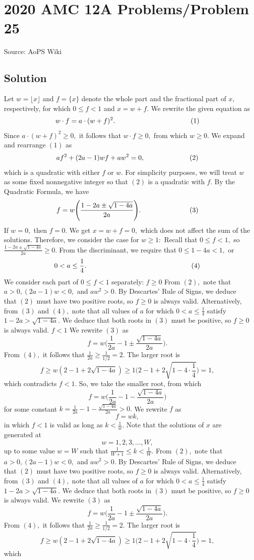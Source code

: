 \documentclass[12pt]{article}
\begin{document}
\section*{{2020 AMC 12A Problems/Problem 25}}
Source: AoPS Wiki

\subsection*{Solution}
Let $w=\lfloor x \rfloor$ and $f=\{x\}$ denote the whole part and the fractional part of $x,$ respectively, for which $0\leq f<1$ and $x=w+f.$ We rewrite the given equation as \[w\cdot f=a\cdot(w+f)^2. \hspace{38.75mm}(1)\] Since $a\cdot(w+f)^2\geq0,$ it follows that $w\cdot f\geq0,$ from which $w\geq0.$ We expand and rearrange $(1)$ as \[af^2+(2a-1)wf+aw^2=0, \hspace{23mm}(2)\] which is a quadratic with either $f$ or $w.$ For simplicity purposes, we will treat $w$ as some fixed nonnegative integer so that $(2)$ is a quadratic with $f.$ By the Quadratic Formula, we have \[f=w\Biggl(\frac{1-2a\pm\sqrt{1-4a}}{2a}\Biggr). \hspace{25mm}(3)\] If $w=0,$ then $f=0.$ We get $x=w+f=0,$ which does not affect the sum of the solutions. Therefore, we consider the case for $w\geq1:$ Recall that $0\leq f<1,$ so $\frac{1-2a\pm\sqrt{1-4a}}{2a}\geq0.$ From the discriminant, we require that $0\leq1-4a<1,$ or \[0<a\leq\frac14. \hspace{54mm}(4)\] We consider each part of $0\leq f<1$ separately: $f\geq0$ From $(2),$ note that $a>0, (2a-1)w<0,$ and $aw^2>0.$ By Descartes' Rule of Signs, we deduce that $(2)$ must have two positive roots, so $f\geq0$ is always valid. Alternatively, from $(3)$ and $(4),$ note that all values of $a$ for which $0<a\leq\frac14$ satisfy $1-2a>\sqrt{1-4a}.$ We deduce that both roots in $(3)$ must be positive, so $f\geq0$ is always valid. $f<1$ We rewrite $(3)$ as \[f=w\Biggl(\frac{1}{2a}-1\pm\frac{\sqrt{1-4a}}{2a}\Biggr).\] From $(4),$ it follows that $\frac{1}{2a}\geq\frac{1}{1/2}=2.$ The larger root is \[f\geq w\left(2-1+2\sqrt{1-4a}\right) \geq 1\Biggl(2-1+2\sqrt{1-4\cdot\frac14}\Biggr) = 1,\] which contradicts $f<1.$ So, we take the smaller root, from which \[f=w\Biggl(\frac{1}{2a}-1-\frac{\sqrt{1-4a}}{2a}\Biggr)\] for some constant $k=\frac{1}{2a}-1-\frac{\sqrt{1-4a}}{2a}>0.$ We rewrite $f$ as \[f=wk,\] in which $f<1$ is valid as long as $k<\frac 1w.$ Note that the solutions of $x$ are generated at \[w=1,2,3,\ldots,W,\] up to some value $w=W$ such that $\frac{1}{W+1}\leq k<\frac1W.$ From $(2),$ note that $a>0, (2a-1)w<0,$ and $aw^2>0.$ By Descartes' Rule of Signs, we deduce that $(2)$ must have two positive roots, so $f\geq0$ is always valid. Alternatively, from $(3)$ and $(4),$ note that all values of $a$ for which $0<a\leq\frac14$ satisfy $1-2a>\sqrt{1-4a}.$ We deduce that both roots in $(3)$ must be positive, so $f\geq0$ is always valid. We rewrite $(3)$ as \[f=w\Biggl(\frac{1}{2a}-1\pm\frac{\sqrt{1-4a}}{2a}\Biggr).\] From $(4),$ it follows that $\frac{1}{2a}\geq\frac{1}{1/2}=2.$ The larger root is \[f\geq w\left(2-1+2\sqrt{1-4a}\right) \geq 1\Biggl(2-1+2\sqrt{1-4\cdot\frac14}\Biggr) = 1,\] which 
\end{document}
